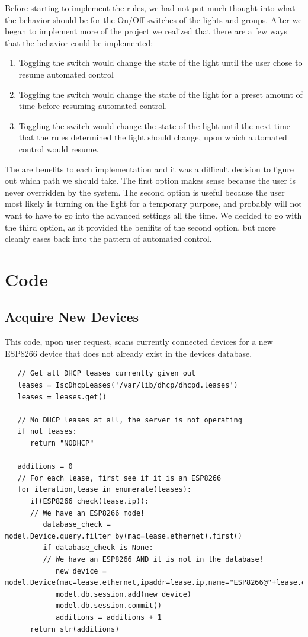\documentclass[oneside,openright]{book}
\begin{document}
Before starting to implement the rules, we had not put much thought into what
the behavior should be for the On/Off switches of the lights and groups. After
we began to implement more of the project we realized that there are a few ways
that the behavior could be implemented:

\begin{enumerate}
  \item Toggling the switch would change the state of the light until the user
      chose to resume automated control
  \item Toggling the switch would change the state of the light for a preset
      amount of time before resuming automated control.
  \item Toggling the switch would change the state of the light until the next
      time that the rules determined the light should change, upon which
      automated control would resume.
\end{enumerate}

The are benefits to each implementation and it was a difficult decision to
figure out which path we should take. The first option makes sense because the
user is never overridden by the system. The second option is useful because the
user most likely is turning on the light for a temporary purpose, and probably
will not want to have to go into the advanced settings all the time. We decided
to go with the third option, as it provided the benifits of the second option,
but more cleanly eases back into the pattern of automated control.

\section{Code}

\subsection{Acquire New Devices}

This code, upon user request, scans currently connected devices for a new
ESP8266 device that does not already exist in the devices database.

\begin{lstlisting}
   // Get all DHCP leases currently given out
   leases = IscDhcpLeases('/var/lib/dhcp/dhcpd.leases')
   leases = leases.get()

   // No DHCP leases at all, the server is not operating
   if not leases:
      return "NODHCP"

   additions = 0
   // For each lease, first see if it is an ESP8266
   for iteration,lease in enumerate(leases):
      if(ESP8266_check(lease.ip)):
      // We have an ESP8266 mode!
         database_check = model.Device.query.filter_by(mac=lease.ethernet).first()
         if database_check is None:
         // We have an ESP8266 AND it is not in the database!
            new_device = model.Device(mac=lease.ethernet,ipaddr=lease.ip,name="ESP8266@"+lease.ethernet)
            model.db.session.add(new_device)
            model.db.session.commit()
            additions = additions + 1
      return str(additions)
   \end{lstlisting}
\end{document}
